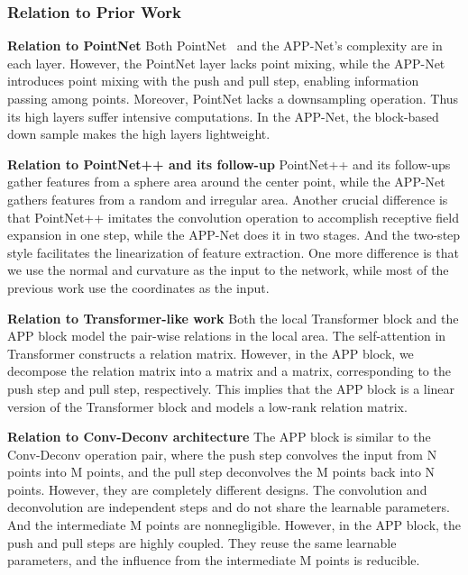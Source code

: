 \documentclass[journal]{IEEEtran}
\begin{document}
\subsubsection{Relation to Prior Work}


\noindent
{\bf Relation to PointNet} Both PointNet~\cite{PointNet} and the APP-Net's complexity are  in each layer. However, the PointNet layer lacks point mixing, while the APP-Net introduces point mixing with the push and pull step, enabling information passing among points. Moreover, PointNet lacks a downsampling operation. Thus its high layers suffer intensive computations. In the APP-Net, the block-based down sample makes the high layers lightweight. 

\noindent
{\bf Relation to PointNet++ and its follow-up} PointNet++ and its follow-ups gather features from a sphere area around the center point, while the APP-Net gathers features from a random and irregular area. Another crucial difference is that PointNet++ imitates the convolution operation to accomplish receptive field expansion in one step, while the APP-Net does it in two stages. And the two-step style facilitates the linearization of feature extraction. One more difference is that we use the normal and curvature as the input to the network, while most of the previous work use the coordinates as the input.



\noindent
{\bf Relation to Transformer-like work} Both the local Transformer block and the APP block model the pair-wise relations in the local area. The self-attention in Transformer constructs a  relation matrix. However, in the APP block, we decompose the  relation matrix into a  matrix and a  matrix, corresponding to the push step and pull step, respectively. This implies that the APP block is a linear version of the Transformer block and models a low-rank relation matrix.


\noindent
{\bf Relation to Conv-Deconv architecture} The APP block is similar to the Conv-Deconv operation pair, where the push step convolves the input from N points into M points, and the pull step deconvolves the M points back into N points. However, they are completely different designs. The convolution and deconvolution are independent steps and do not share the learnable parameters. And the intermediate M points are nonnegligible. However, in the APP block, the push and pull steps are highly coupled. They reuse the same learnable parameters, and the influence from the intermediate M points is reducible.
\end{document}

